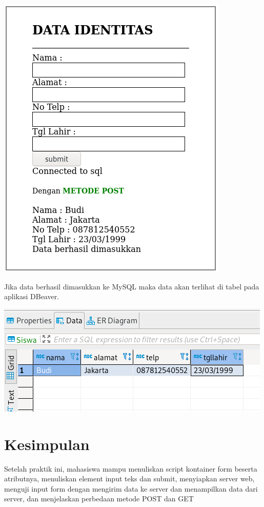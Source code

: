 \documentclass[a4paper,12pt]{article}
\begin{document}
\begin{center}
    \includegraphics[scale=.6]{7.png} 
\end{center}
Jika data berhasil dimasukkan ke MySQL maka data akan terlihat di tabel pada aplikasi DBeaver.
\begin{center}
    \includegraphics[scale=.6]{8.png} 
\end{center}

\newpage

\section{Kesimpulan}
Setelah praktik ini, mahasiswa mampu menuliskan script kontainer form beserta atributnya, menuliskan element input teks dan submit, menyiapkan server web, menguji input form dengan mengirim data ke server dan menampilkan data dari server, dan menjelaskan perbedaan metode POST dan GET
\end{document}
